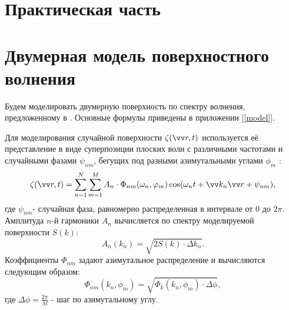 \section{Практическая часть}
\section{Двумерная модель поверхностного волнения}
Будем моделировать двумерную поверхность по спектру волнения, предложенному в \cite{Karaev1}. Основные формулы приведены в приложении [\ref{model}]. 

Для моделирования случайной поверхности $\zeta(\vv r,t)$ используется её представление в виде суперпозиции плоских волн с различными частотами и случайными фазами $\psi_{nm}$, бегущих под разными азимутальными углами $\phi_m$ \cite{Longe}:
\begin{equation}
	\zeta(\vv r, t)= \sum\limits_{n=1}^N \sum_{m=1}^M A_n\cdot 
		\Phi_{nm}(\omega_n, \phi_m) \cos(\omega_n t + \vv k_n \vv r + \psi_{nm}),
\end{equation}
где $\psi_{nm}$- случайная фаза, равномерно распределенная в интервале от 0 до $2\pi$. Амплитуда $n$-й гармоники $A_n$ вычисляется по спектру моделируемой поверхности $S(k)$:
\begin{equation}
 	A_n(k_n)=\sqrt{2S(k) \cdot \Delta k_n}.
 \end{equation} 
 Коэффициенты $\Phi_{nm}$ задают азимутальное распределение и вычисляются следующим образом:
 \begin{equation}
 	\Phi_{nm}(k_n, \phi_m)= \sqrt{\Phi_k(k_n,\phi_m)\cdot \Delta \phi},
 \end{equation}
 где $\Delta \phi=\frac{2 \pi}{M}$ - шаг по азимутальному углу.

